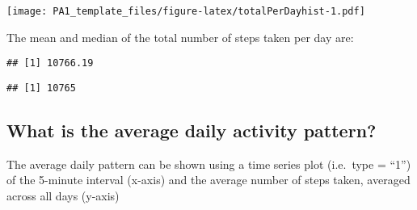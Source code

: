 \documentclass[
]{article}
\newenvironment{Shaded}{\begin{snugshade}}{\end{snugshade}}
\newcommand{\AttributeTok}[1]{\textcolor[rgb]{0.77,0.63,0.00}{#1}}
\newcommand{\FunctionTok}[1]{\textcolor[rgb]{0.00,0.00,0.00}{#1}}
\newcommand{\NormalTok}[1]{#1}
\newcommand{\OtherTok}[1]{\textcolor[rgb]{0.56,0.35,0.01}{#1}}
\newcommand{\SpecialCharTok}[1]{\textcolor[rgb]{0.00,0.00,0.00}{#1}}
\newcommand{\StringTok}[1]{\textcolor[rgb]{0.31,0.60,0.02}{#1}}
\begin{document}
\texttt{[image: PA1\_template\_files/figure-latex/totalPerDayhist-1.pdf]}

The mean and median of the total number of steps taken per day are:

\begin{Shaded}
\end{Shaded}

\begin{verbatim}
## [1] 10766.19
\end{verbatim}

\begin{Shaded}
\end{Shaded}

\begin{verbatim}
## [1] 10765
\end{verbatim}

\hypertarget{what-is-the-average-daily-activity-pattern}{%
\subsection{What is the average daily activity
pattern?}\label{what-is-the-average-daily-activity-pattern}}

The average daily pattern can be shown using a time series plot
(i.e.~type = ``1'') of the 5-minute interval (x-axis) and the average
number of steps taken, averaged across all days (y-axis)

\begin{Shaded}
\end{Shaded}
\end{document}
